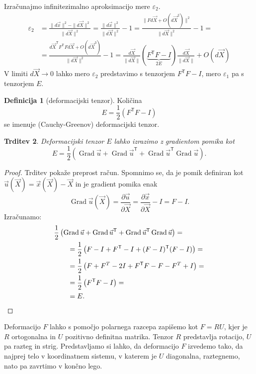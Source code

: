 \documentclass[12pt,a4paper,twoside]{article}
\theoremstyle{definition} %
\newtheorem{definicija}{Definicija}[section]
\theoremstyle{plain} %
\newtheorem{trditev}[definicija]{Trditev}
\numberwithin{equation}{section}
\newcommand{\T}{\mathsf{T}}
\newcommand{\Grad}{\operatorname{Grad}}
\newcommand{\eps}{\varepsilon}
\newcommand{\dpar}[2]{\ensuremath{\frac{\partial #1}{\partial #2}}}
\newcommand{\vu}{\vec{u}}
\newcommand{\vX}{\vec{X}}
\newcommand{\vx}{\vec{x}}
\begin{document}
Izračunajmo infinitezimalno aproksimacijo mere $\eps_2$.
\begin{align}
  \eps_2 &=
  \frac{\|d\vx\|^2 - \|d\vX\|^2}{\|d\vX\|^2} =
  \frac{\|d\vx\|^2}{\|d\vX\|^2}  - 1=
  \frac{\|F d\vX + O(d\vX^2)\|^2}{\|d\vX\|^2} - 1 = \nonumber \\ &=
  \frac{d\vX^\T F^\T F d\vX + O(d\vX^3)}{\|d\vX\|^2} - 1 =
  \frac{d\vX}{\|d\vX\|}(\underbrace{F^\T F - I}_{2E})\frac{d\vX}{\|d\vX\|} + O(d\vX)
\end{align}
V limiti $d\vX \to 0$ lahko mero $\eps_2$ predstavimo s tenzorjem $F^\T F- I$,
mero $\eps_1$ pa s tenzorjem $E$.

\begin{definicija}[deformacijski tenzor]
  Količina
  \begin{equation}
    E = \frac12 (F^\T F - I)
  \end{equation}
  se imenuje (Cauchy-Greenov) deformacijski tenzor.
\end{definicija}
\begin{trditev}
  Deformacijski tenzor $E$ lahko izrazimo z gradientom pomika kot
  \begin{equation}
    \label{eq:strain-tensor}
    E = \frac12\left( \Grad \vu + \Grad \vu^\T + \Grad \vu^\T \Grad \vu \right).
  \end{equation}
\end{trditev}
\begin{proof}
Trditev pokaže preprost račun. Spomnimo se, da je pomik definiran kot $\vu(\vX) =
\vx(\vX) - \vX$ in je gradient pomika enak
\[ \Grad \vu(\vX) = \dpar{\vu}{\vX} = \dpar{\vx}{\vX} - I = F - I.  \]
Izračunamo:
\begin{align*}
  &\frac12\left( \Grad \vu + \Grad \vu^\T + \Grad \vu^\T \Grad \vu \right) = \\
  &\qquad=\frac12\left(F - I + F^\T - I  + (F-I)^\T(F-I)\right) = \\
  &\qquad=\frac12\left(F + F^T - 2I + F^\T F - F - F^T + I\right) = \\
  &\qquad=\frac12\left(F^\T F - I\right) = \\
  &\qquad=E.\qedhere
\end{align*}
\end{proof}

Deformacijo $F$ lahko s pomočjo polarnega razcepa zapišemo kot $F = RU$, kjer je
$R$ ortogonalna in $U$ pozitivno definitna matrika. Tenzor $R$ predstavlja
rotacijo, $U$ pa razteg in strig. Predstavljamo si lahko, da deformacijo $F$
izvedemo tako, da najprej telo v koordinatnem sistemu, v katerem je $U$ diagonalna,
raztegnemo, nato pa zavrtimo v končno lego.
\end{document}

